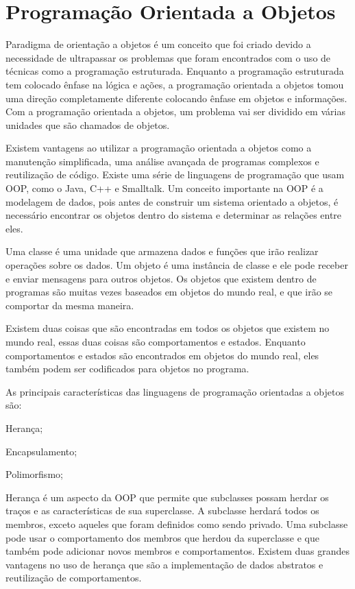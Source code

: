 \section{Programação Orientada a Objetos}

  Paradigma de orientação a objetos é um conceito que foi criado devido a necessidade de ultrapassar os problemas que foram encontrados com o uso de técnicas como a programação estruturada. Enquanto a programação estruturada tem colocado ênfase na lógica e ações, a programação orientada a objetos tomou uma direção completamente diferente colocando ênfase em objetos e informações. Com a programação orientada a objetos, um problema vai ser dividido em várias unidades que são chamados de objetos.

  Existem vantagens ao utilizar a programação orientada a objetos como a manutenção simplificada, uma análise avançada de programas complexos e reutilização de código. Existe uma série de linguagens de programação que usam \ac{OOP}, como o Java, C++ e Smalltalk. Um conceito importante na \ac{OOP} é a modelagem de dados, pois antes de construir um sistema orientado a objetos, é necessário encontrar os objetos dentro do sistema e determinar as relações entre eles.

  Uma classe é uma unidade que armazena dados e funções que irão realizar operações sobre os dados. Um objeto é uma instância de classe e ele pode receber e enviar mensagens para outros objetos. Os objetos que existem dentro de programas são muitas vezes baseados em objetos do mundo real, e que irão se comportar da mesma maneira.

  Existem duas coisas que são encontradas em todos os objetos que existem no mundo real, essas duas coisas são comportamentos e estados. Enquanto comportamentos e estados são encontrados em objetos do mundo real, eles também podem ser codificados para objetos no programa.

  As principais características das linguagens de programação orientadas a objetos são:

  \begin{compactitem}
    \item Herança;
    \item Encapsulamento;
    \item Polimorfismo;
  \end{compactitem}

  Herança é um aspecto da \ac{OOP} que permite que subclasses possam herdar os traços e as características de sua superclasse. A subclasse herdará todos os membros, exceto aqueles que foram definidos como sendo privado. Uma subclasse pode usar o comportamento dos membros que herdou da superclasse e que também pode adicionar novos membros e comportamentos. Existem duas grandes vantagens no uso de herança que são a implementação de dados abstratos e reutilização de comportamentos.

